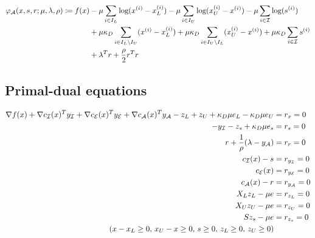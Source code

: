 \documentclass[10pt]{article}
\begin{document}
	\begin{equation}
		\begin{aligned}
		\varphi_{\mathcal A}(x,s,r; \mu,\lambda,\rho) \coloneqq f(x) &- \mu \sum_{i \in I_L} \text{log}(x^{(i)} - x^{(i)}_L) - \mu \sum_{i \in I_U} \text{log}(x^{(i)}_U - x^{(i)}) -\mu \sum_{i \in \mathcal I} \text{log}(s^{(i)}) \\
		& + \mu\kappa_D \sum_{i \in I_L \backslash I_U} (x^{(i)} - x^{(i)}_L)
		+ \mu\kappa_D \sum_{i \in I_U \backslash I_L} (x_U^{(i)} - x^{(i)})
		+ \mu\kappa_D \sum_{i \in \mathcal I} s^{(i)}\\
		& + \lambda^T r + \frac{\rho}{2}r^T r \notag
		\end{aligned}
	\end{equation}
	
\subsection*{Primal-dual equations}
	\begin{equation}
		\begin{aligned}
			\nabla f(x) + \nabla c_{\mathcal I}(x)^T y_{\mathcal I} + \nabla c_{\mathcal E}(x)^T y_{\mathcal E} + \nabla c_{\mathcal A}(x)^T y_{\mathcal A} - z_L + z_U + \kappa_D \mu e_{L} - \kappa_D \mu e_{U} &= r_x = 0 \\
			-y_{\mathcal I} - z_s + \kappa_D \mu e_s &= r_s = 0\\
			r + \frac{1}{\rho}(\lambda - y_{\mathcal A}) &= r_r = 0 \\
			c_{\mathcal I}(x) - s &= r_{y_{\mathcal I}} = 0 \\
			c_{\mathcal E}(x) &= r_{y_{\mathcal E}} = 0 \\
			c_{\mathcal A}(x) -r &= r_{y_{\mathcal A}} = 0 \\
			X_L z_L - \mu e &= r_{z_L} = 0 \\
			X_U z_U - \mu e &= r_{z_U} = 0 \\
			Sz_s - \mu e &= r_{z_s} = 0 \\
			(x-x_L \geq 0,\, x_U - x \geq 0,\,s \geq 0,\, z_L \geq 0,\, z_U \geq 0)
		\end{aligned} \notag
	\end{equation}

	
\end{document}
